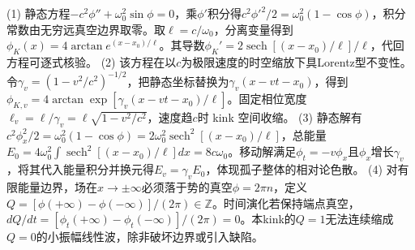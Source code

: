 (1) 静态方程\(-c^2\phi''+\omega_0^2\sin\phi=0\)，乘\(\phi'\)积分得\(c^2\phi'^2/2=\omega_0^2(1-\cos\phi)\)，积分常数由无穷远真空边界取零。取\(\ell=c/\omega_0\)，分离变量得到\(\phi_K(x)=4\arctan e^{(x-x_0)/\ell}\)。其导数\(\phi_K'=2\operatorname{sech}[(x-x_0)/\ell]/\ell\)，代回方程可逐式核验。
(2) 该方程在以\(c\)为极限速度的时空缩放下具Lorentz型不变性。令\(\gamma_v=(1-v^2/c^2)^{-1/2}\)，把静态坐标替换为\(\gamma_v(x-vt-x_0)\)，得到\(\phi_{K,v}=4\arctan\exp[\gamma_v(x-vt-x_0)/\ell]\)。固定相位宽度\(\ell_v=\ell/\gamma_v=\ell\sqrt{1-v^2/c^2}\)，速度趋\(c\)时 kink 空间收缩。
(3) 静态解有\(c^2\phi_x^2/2=\omega_0^2(1-\cos\phi)=2\omega_0^2\operatorname{sech}^2[(x-x_0)/\ell]\)，总能量\(E_0=4\omega_0^2\int\operatorname{sech}^2[(x-x_0)/\ell]dx=8c\omega_0\)。移动解满足\(\phi_t=-v\phi_x\)且\(\phi_x\)增长\(\gamma_v\)，将其代入能量积分并换元得\(E_v=\gamma_v E_0\)，体现孤子整体的相对论色散。
(4) 对有限能量边界，场在\(x\to\pm\infty\)必须落于势的真空\(\phi=2\pi n\)，定义\(Q=[\phi(+\infty)-\phi(-\infty)]/(2\pi)\in\mathbb Z\)。时间演化若保持端点真空，\(dQ/dt=[\phi_t(+\infty)-\phi_t(-\infty)]/(2\pi)=0\)。本kink的\(Q=1\)无法连续缩成\(Q=0\)的小振幅线性波，除非破坏边界或引入缺陷。
